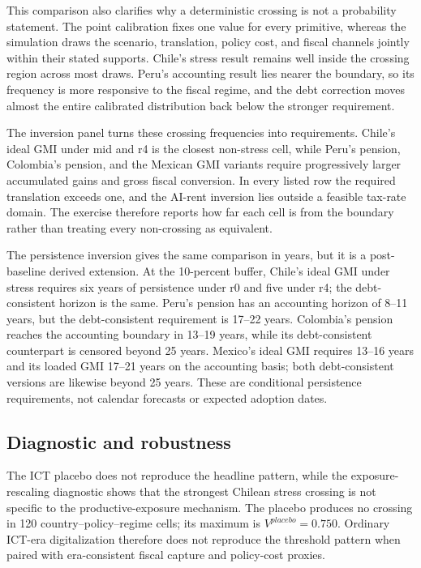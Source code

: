 This comparison also clarifies why a deterministic crossing is not a probability statement. The point calibration fixes one value for every primitive, whereas the simulation draws the scenario, translation, policy cost, and fiscal channels jointly within their stated supports. Chile's stress result remains well inside the crossing region across most draws. Peru's accounting result lies nearer the boundary, so its frequency is more responsive to the fiscal regime, and the debt correction moves almost the entire calibrated distribution back below the stronger requirement.

The inversion panel turns these crossing frequencies into requirements. Chile's ideal GMI under mid and r4 is the closest non-stress cell, while Peru's pension, Colombia's pension, and the Mexican GMI variants require progressively larger accumulated gains and gross fiscal conversion. In every listed row the required translation exceeds one, and the AI-rent inversion lies outside a feasible tax-rate domain. The exercise therefore reports how far each cell is from the boundary rather than treating every non-crossing as equivalent.

The persistence inversion gives the same comparison in years, but it is a post-baseline derived extension. At the 10-percent buffer, Chile's ideal GMI under stress requires six years of persistence under r0 and five under r4; the debt-consistent horizon is the same. Peru's pension has an accounting horizon of 8--11 years, but the debt-consistent requirement is 17--22 years. Colombia's pension reaches the accounting boundary in 13--19 years, while its debt-consistent counterpart is censored beyond 25 years. Mexico's ideal GMI requires 13--16 years and its loaded GMI 17--21 years on the accounting basis; both debt-consistent versions are likewise beyond 25 years. These are conditional persistence requirements, not calendar forecasts or expected adoption dates.



\subsection{Diagnostic and robustness}\label{subsec:results_diagnostics}

The ICT placebo does not reproduce the headline pattern, while the exposure-rescaling diagnostic shows that the strongest Chilean stress crossing is not specific to the productive-exposure mechanism. The placebo produces no crossing in 120 country--policy--regime cells; its maximum is $V^{placebo}=0.750$. Ordinary ICT-era digitalization therefore does not reproduce the threshold pattern when paired with era-consistent fiscal capture and policy-cost proxies.


